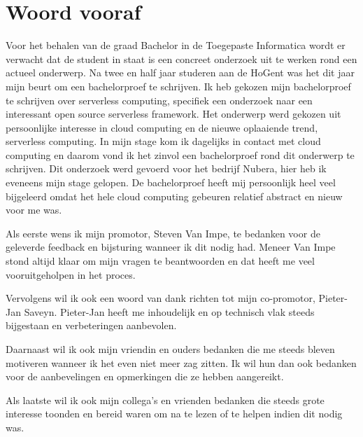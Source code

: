 
\chapter*{Woord vooraf}
\label{ch:voorwoord}

Voor het behalen van de graad Bachelor in de Toegepaste Informatica wordt er verwacht dat de student in staat is een concreet onderzoek uit te werken rond een actueel onderwerp. Na twee en half jaar studeren aan de HoGent was het dit jaar mijn beurt om een bachelorproef te schrijven. Ik heb gekozen mijn bachelorproef te schrijven over serverless computing, specifiek een onderzoek naar een interessant open source serverless framework. Het onderwerp werd gekozen uit persoonlijke interesse in cloud computing en de nieuwe oplaaiende trend, serverless computing. In mijn stage kom ik dagelijks in contact met cloud computing en daarom vond ik het zinvol een bachelorproef rond dit onderwerp te schrijven. Dit onderzoek werd gevoerd voor het bedrijf Nubera, hier heb ik eveneens mijn stage gelopen. De bachelorproef heeft mij persoonlijk heel veel bijgeleerd omdat het hele cloud computing gebeuren relatief abstract en nieuw voor me was. 

Als eerste wens ik mijn promotor, Steven Van Impe, te bedanken voor de geleverde feedback en bijsturing wanneer ik dit nodig had. Meneer Van Impe stond altijd klaar om mijn vragen te beantwoorden en dat heeft me veel vooruitgeholpen in het proces.

Vervolgens wil ik ook een woord van dank richten tot mijn co-promotor, Pieter-Jan Saveyn. Pieter-Jan heeft me inhoudelijk en op technisch vlak steeds bijgestaan en verbeteringen aanbevolen.

Daarnaast wil ik ook mijn vriendin en ouders bedanken die me steeds bleven motiveren wanneer ik het even niet meer zag zitten. Ik wil hun dan ook bedanken voor de aanbevelingen en opmerkingen die ze hebben aangereikt.

Als laatste wil ik ook mijn collega's en vrienden bedanken die steeds grote interesse toonden en bereid waren om na te lezen of te helpen indien dit nodig was.
